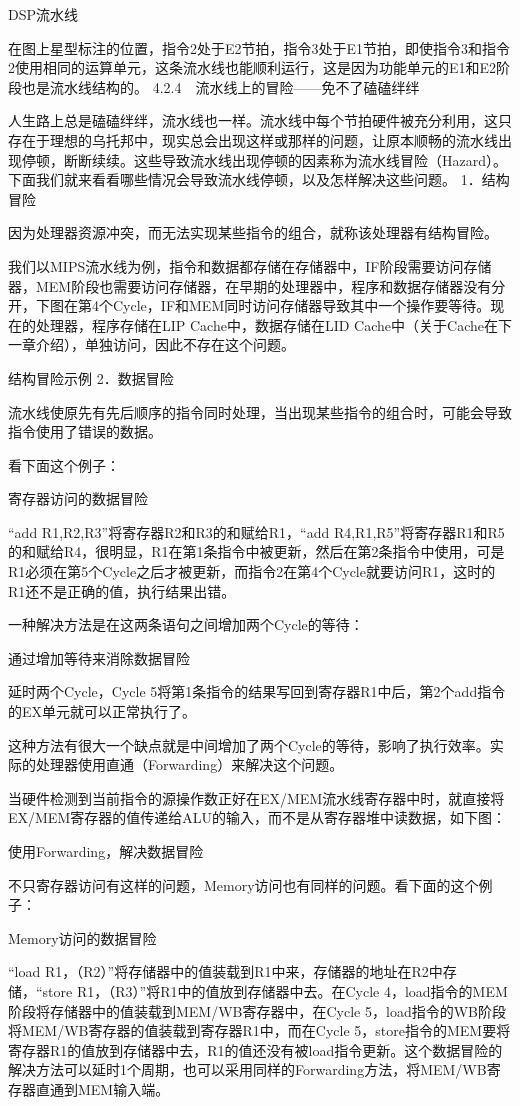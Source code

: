 \documentclass[12pt,UTF8]{ctexbook}
\begin{document}
DSP流水线

在图上星型标注的位置，指令2处于E2节拍，指令3处于E1节拍，即使指令3和指令2使用相同的运算单元，这条流水线也能顺利运行，这是因为功能单元的E1和E2阶段也是流水线结构的。
4.2.4　流水线上的冒险——免不了磕磕绊绊

人生路上总是磕磕绊绊，流水线也一样。流水线中每个节拍硬件被充分利用，这只存在于理想的乌托邦中，现实总会出现这样或那样的问题，让原本顺畅的流水线出现停顿，断断续续。这些导致流水线出现停顿的因素称为流水线冒险（Hazard）。下面我们就来看看哪些情况会导致流水线停顿，以及怎样解决这些问题。
1．结构冒险

因为处理器资源冲突，而无法实现某些指令的组合，就称该处理器有结构冒险。

我们以MIPS流水线为例，指令和数据都存储在存储器中，IF阶段需要访问存储器，MEM阶段也需要访问存储器，在早期的处理器中，程序和数据存储器没有分开，下图在第4个Cycle，IF和MEM同时访问存储器导致其中一个操作要等待。现在的处理器，程序存储在LIP Cache中，数据存储在LID Cache中（关于Cache在下一章介绍），单独访问，因此不存在这个问题。

结构冒险示例
2．数据冒险

流水线使原先有先后顺序的指令同时处理，当出现某些指令的组合时，可能会导致指令使用了错误的数据。

看下面这个例子：

寄存器访问的数据冒险

“add R1,R2,R3”将寄存器R2和R3的和赋给R1，“add R4,R1,R5”将寄存器R1和R5的和赋给R4，很明显，R1在第1条指令中被更新，然后在第2条指令中使用，可是R1必须在第5个Cycle之后才被更新，而指令2在第4个Cycle就要访问R1，这时的R1还不是正确的值，执行结果出错。

一种解决方法是在这两条语句之间增加两个Cycle的等待：

通过增加等待来消除数据冒险

延时两个Cycle，Cycle 5将第1条指令的结果写回到寄存器R1中后，第2个add指令的EX单元就可以正常执行了。

这种方法有很大一个缺点就是中间增加了两个Cycle的等待，影响了执行效率。实际的处理器使用直通（Forwarding）来解决这个问题。

当硬件检测到当前指令的源操作数正好在EX/MEM流水线寄存器中时，就直接将EX/MEM寄存器的值传递给ALU的输入，而不是从寄存器堆中读数据，如下图：

使用Forwarding，解决数据冒险

不只寄存器访问有这样的问题，Memory访问也有同样的问题。看下面的这个例子：

Memory访问的数据冒险

“load R1，（R2）”将存储器中的值装载到R1中来，存储器的地址在R2中存储，“store R1，（R3）”将R1中的值放到存储器中去。在Cycle 4，load指令的MEM阶段将存储器中的值装载到MEM/WB寄存器中，在Cycle 5，load指令的WB阶段将MEM/WB寄存器的值装载到寄存器R1中，而在Cycle 5，store指令的MEM要将寄存器R1的值放到存储器中去，R1的值还没有被load指令更新。这个数据冒险的解决方法可以延时1个周期，也可以采用同样的Forwarding方法，将MEM/WB寄存器直通到MEM输入端。
\end{document}
